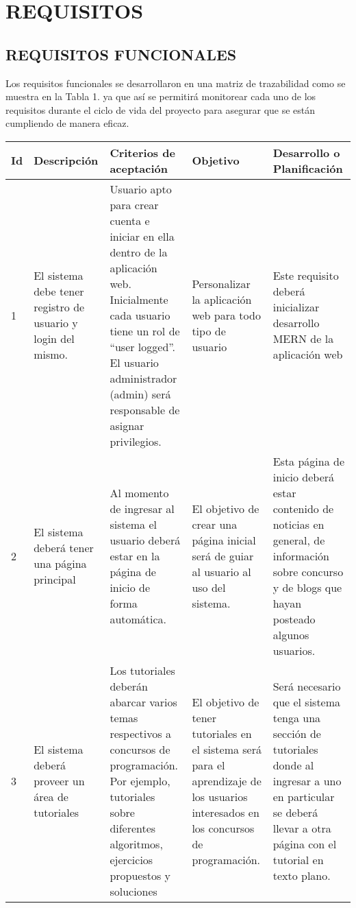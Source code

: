 \section{REQUISITOS}

\subsection{REQUISITOS FUNCIONALES}

Los requisitos funcionales se desarrollaron en una matriz de trazabilidad como se muestra en la Tabla 1. ya que así se permitirá monitorear cada uno de los requisitos durante el ciclo de vida del proyecto para asegurar que se están cumpliendo de manera eficaz.

 \begin{longtable}[c]{| m{0.5cm} | m{3.5cm} | m{3.5cm} | m{3cm} | m{3.5cm} |}
    \hline
    Id & Descripción & Criterios de aceptación & Objetivo & Desarrollo o Planificación
    \\ \hline
    \endfirsthead
    \endhead
    1
    & El sistema debe tener registro de usuario y login del mismo. 
    & Usuario apto para crear cuenta e iniciar en ella dentro de la aplicación web. Inicialmente cada usuario tiene un rol de “user logged”. El usuario administrador (admin) será responsable de asignar privilegios.
    & Personalizar la aplicación web para todo tipo de usuario
    & Este requisito deberá inicializar desarrollo MERN de la aplicación web
    \\ \hline
    2
    & El sistema deberá tener una página principal
    & Al momento de ingresar al sistema el usuario deberá estar en la página de inicio de forma automática.
    & El objetivo de crear una página inicial será de guiar al usuario al uso del sistema.
    & Esta página de inicio deberá estar contenido de noticias en general, de información sobre concurso y de blogs que hayan posteado algunos usuarios.
    \\ \hline
            3
            & El sistema deberá
proveer
un área de tutoriales
            & Los tutoriales deberán abarcar
varios temas respectivos a
concursos de programación. Por
ejemplo, tutoriales
sobre diferentes algoritmos,
ejercicios propuestos y
soluciones
            & El objetivo de tener
tutoriales en el sistema será
para el
aprendizaje de los usuarios
interesados en los concursos
de
programación.
            & Será necesario que el sistema
tenga una sección de tutoriales
donde al ingresar a uno en
particular se deberá llevar a otra
página con el tutorial en texto plano.
            \\ \hline

\end{longtable}

